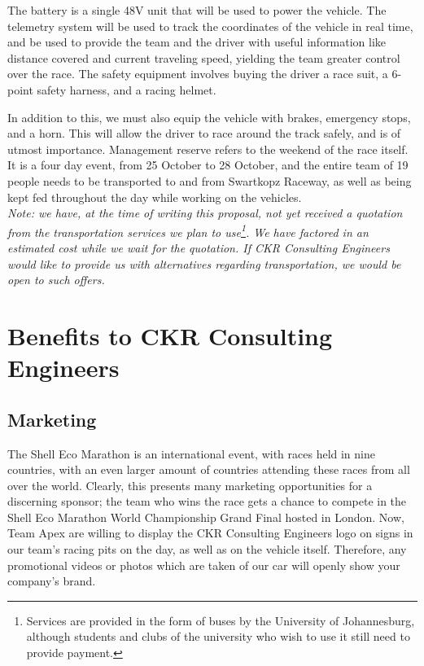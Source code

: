 \documentclass[a4paper, 12pt]{article}
\newcommand{\company}{CKR Consulting Engineers}
\begin{document}
		The battery is a single 48V unit that will be used to power the vehicle. The telemetry system will be used to track the coordinates of the vehicle in real time, and be used to provide the team and the driver with useful information like distance covered and current traveling speed, yielding the team greater control over the race. The safety equipment involves buying the driver a race suit, a 6-point safety harness, and a racing helmet.

		In addition to this, we must also equip the vehicle with brakes, emergency stops, and a horn. This will allow the driver to race around the track safely, and is of utmost importance. Management reserve refers to the weekend of the race itself. It is a four day event, from 25 October to 28 October, and the entire team of 19 people needs to be transported to and from Swartkopz Raceway, as well as being kept fed throughout the day while working on the vehicles.\\

		\noindent\textit{Note: we have, at the time of writing this proposal, not yet received a quotation from the transportation services we plan to use\footnote{Services are provided in the form of buses by the University of Johannesburg, although students and clubs of the university who wish to use it still need to provide payment.}. We have factored in an estimated cost while we wait for the quotation. If \company{} would like to provide us with alternatives regarding transportation, we would be open to such offers.}

	\section{Benefits to \company{}} %
	\label{sec:benefits_to_the_client}
		\subsection{Marketing} %
		\label{sub:marketing}
			The Shell Eco Marathon is an international event, with races held in nine countries, with an even larger amount of countries attending these races from all over the world. Clearly, this presents many marketing opportunities for a discerning sponsor; the team who wins the race gets a chance to compete in the Shell Eco Marathon World Championship Grand Final hosted in London. Now, Team Apex are willing to display the \company{} logo on signs in our team's racing pits on the day, as well as on the vehicle itself. Therefore, any promotional videos or photos which are taken of our car will openly show your company's brand.
		
\end{document}
